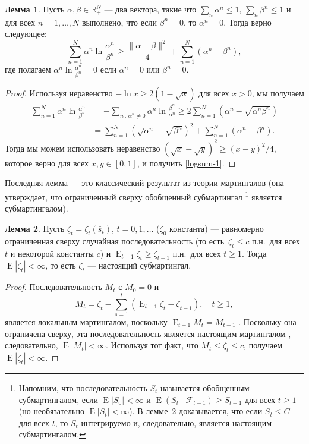 \documentclass[a4paper,12pt,russian]{article} %
\theoremstyle{definition}
\newtheorem{lemma}{Лемма}
\DeclareMathOperator{\E}{E}
\newcommand{\F}{\mathcal{F}}
\newcommand{\R}{\mathbb{R}}
\begin{document}
\begin{lemma}
\label{lemma3-logsum}
Пусть $\alpha,\beta\in\R_+^N$ — два вектора, такие что
$\sum_n \alpha^n \le 1$, $\sum_n \beta^n \le 1$ и для всех $n=1,\ldots,N$ выполнено, что если $\beta^n=0$, то $\alpha^n=0$. Тогда верно следующее:
\begin{equation}
\sum_{n=1}^N\alpha^n \ln\frac{\alpha^n}{\beta^n} \ge
\frac{\|\alpha-\beta\|^2}{4} + \sum_{n=1}^N (\alpha^n-\beta^n),\label{logsum-1}
\end{equation}
где полагаем $\alpha^n \ln\frac{\alpha^n}{\beta^n} = 0$ если $\alpha^n=0$ или $\beta^n=0$.
\end{lemma}

\begin{proof}
Используя неравенство $-\ln x \ge 2(1-\sqrt x)$ для всех $x>0$, мы получаем
\[
\begin{split}
\sum_{n=1}^N \alpha^n \ln\frac{\alpha^n}{\beta^n} &= -\sum_{n\,:\,\alpha^n\neq 0}\alpha^n\ln\frac{\beta^n}{\alpha^n} \ge
2\sum_{n=1}^N (\alpha^n-\sqrt{\alpha^n\beta^n}) \\&= \sum_{n=1}^N(\sqrt{\alpha^n} -
\sqrt{\beta^n})^2 + \sum_{n=1}^N (\alpha^n - \beta^n).
\end{split}
\]
Тогда мы можем использовать неравенство $(\sqrt x - \sqrt y)^2 \ge (x-y)^2/4$, которое верно для всех $x,y\in[0,1]$, и получить \eqref{logsum-1}. 
\end{proof}


Последняя лемма — это классический результат из теории мартингалов (она утверждает, что ограниченный сверху обобщенный субмартингал 
\footnote{Напомним, что последовательность $S_t$ называется обобщенным субмартингалом, если $\E |S_0|<\infty$ и $\E(S_t\mid\F_{t-1})\ge S_{t-1}$ для всех $t\ge 1$ (но необязательно $\E|S_t|<\infty$). В лемме~\ref{lemma4-submart} доказывается, что если $S_t\le C$ для всех $t$, то $S_t$ интегрируемо и, следовательно, является настоящим субмартингалом.} является субмартингалом).


\begin{lemma}
\label{lemma4-submart}
Пусть $\zeta_t=\zeta_t(\bar s_t)$, $t=0,1,\dots$ ($\zeta_0$ константа)  — равномерно ограниченная сверху случайная последовательность (то есть\ $\zeta_t\le c$ п.н.\ для всех $t$ и некоторой константы $c$) и $\E_{t-1} \zeta_t\ge \zeta_{t-1}$ п.н.\ для всех $t\ge 1$.
Тогда $\E|\zeta_t| < \infty$, то есть $\zeta_t$ — настоящий субмартингал.
\end{lemma}
\begin{proof}
Последовательность $M_t$ с $M_0=0$ и
\[
M_t = \zeta_t - \sum_{s=1}^t (\E_{t-1} \zeta_t - \zeta_{t-1}),\quad
t \ge 1,
\]
является локальным мартингалом, поскольку $\E_{t-1} M_t = M_{t-1}$ \cite[Гл.~7.1, Т.~1]{Shiryaev2019}.
Поскольку она ограничена сверху, эта последовательность является настоящим мартингалом  \cite[Гл.~7.1, Т.~3]{Shiryaev2019}, следовательно, $\E |M_t| < \infty$.
Используя тот факт, что $M_t \le \zeta_t \le c$, получаем $\E|\zeta_t| < \infty$. 
\end{proof}
\end{document}
